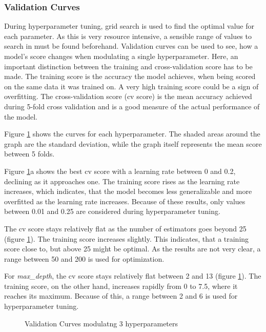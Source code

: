 \subsubsection{Validation Curves}

During hyperparameter tuning, grid search is used to find the optimal value for each parameter.
As this is very resource intensive, a sensible range of values to search in must be found beforehand.
Validation curves can be used to see, how a model's score changes when modulating a single hyperparameter.
Here, an important distinction between the training and cross-validation score has to be made.
The training score is the accuracy the model achieves, when being scored on the same data it was trained on.
A very high training score could be a sign of overfitting.
The cross-validation score (cv score) is the mean accuracy achieved during 5-fold cross validation and is a good measure
of the actual performance of the model.


Figure \ref{fig:Validation Curves modulating 3 hyperparameters} shows the curves for each hyperparameter. The shaded
areas around the graph are the standard deviation, while the graph itself represents the mean score between 5 folds.

Figure \ref{fig:Validation Curves modulating 3 hyperparameters}a shows the best cv score with a learning rate
between 0 and 0.2, declining as it approaches one.
The training score rises as the learning rate increases, which indicates, that the model becomes less generalizable and
more overfitted as the learning rate increases.
Because of these results, only values between 0.01 and 0.25 are considered during hyperparameter tuning.

The cv score stays relatively flat as the number of estimators goes beyond 25 (figure \ref{fig:Validation Curves modulating 3 hyperparameters}).
The training score increases slightly.
This indicates, that a training score close to, but above 25 might be optimal. As the results are not very clear,
a range between 50 and 200 is used for optimization.

For \emph{max\_depth}, the cv score stays relatively flat between 2 and 13 (figure \ref{fig:Validation Curves modulating 3 hyperparameters}).
The training score, on the other hand, increases rapidly from 0 to 7.5, where it reaches its maximum.
Because of this, a range between 2 and 6 is used for hyperparameter tuning.

\begin{figure}[H]
    \centering
    \qquad
    \qquad
    \caption{Validation Curves modulatng 3 hyperparameters}%
    \label{fig:Validation Curves modulating 3 hyperparameters}%
\end{figure}

